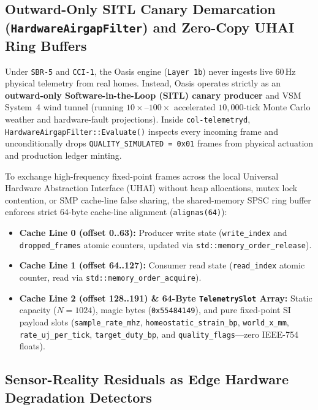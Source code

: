 \subsection{Outward-Only SITL Canary Demarcation (\texttt{HardwareAirgapFilter}) and Zero-Copy UHAI Ring Buffers}

Under \texttt{SBR-5} and \texttt{CCI-1}, the Oasis engine (\texttt{Layer 1b}) never ingests live 60\,Hz physical telemetry from real homes. Instead, Oasis operates strictly as an \textbf{outward-only Software-in-the-Loop (SITL) canary producer} and VSM System~4 wind tunnel (running $10\times\text{--}100\times$ accelerated $10{,}000$-tick Monte Carlo weather and hardware-fault projections). Inside \texttt{col-telemetryd}, \texttt{HardwareAirgapFilter::Evaluate()} inspects every incoming frame and unconditionally drops \texttt{QUALITY\_SIMULATED = 0x01} frames from physical actuation and production ledger minting.

To exchange high-frequency fixed-point frames across the local Universal Hardware Abstraction Interface (UHAI) without heap allocations, mutex lock contention, or SMP cache-line false sharing, the shared-memory SPSC ring buffer enforces strict 64-byte cache-line alignment (\texttt{alignas(64)}):
\begin{itemize}
    \item \textbf{Cache Line 0 (offset 0..63):} Producer write state (\texttt{write\_index} and \texttt{dropped\_frames} atomic counters, updated via \texttt{std::memory\_order\_release}).
    \item \textbf{Cache Line 1 (offset 64..127):} Consumer read state (\texttt{read\_index} atomic counter, read via \texttt{std::memory\_order\_acquire}).
    \item \textbf{Cache Line 2 (offset 128..191) \& 64-Byte \texttt{TelemetrySlot} Array:} Static capacity ($N = 1024$), magic bytes (\texttt{0x55484149}), and pure fixed-point SI payload slots (\texttt{sample\_rate\_mhz}, \texttt{homeostatic\_strain\_bp}, \texttt{world\_x\_mm}, \texttt{rate\_uj\_per\_tick}, \texttt{target\_duty\_bp}, and \texttt{quality\_flags}---zero IEEE-754 floats).
\end{itemize}

\subsection{Sensor-Reality Residuals as Edge Hardware Degradation Detectors}


